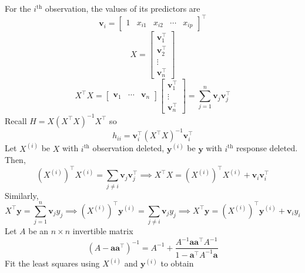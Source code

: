 For the $ i^{\text{th}} $ observation, the values
of its predictors are
\[ \symbf{v}_i=\begin{bmatrix}
            1 & x_{i1} & x_{i2} & \cdots & x_{i p}
      \end{bmatrix}^\top \]
\[ X=\begin{bmatrix}
            \symbf{v}_1^\top \\
            \symbf{v}_2^\top \\
            \vdots           \\
            \symbf{v}_n^\top
      \end{bmatrix} \]
\[ X^\top X=\begin{bmatrix}
            \symbf{v}_1 & \cdots & \symbf{v}_n
      \end{bmatrix}\begin{bmatrix}
            \symbf{v}_1^\top \\
            \vdots           \\
            \symbf{v}_n^\top
      \end{bmatrix}=\sum_{j=1}^{n}\symbf{v}_j\symbf{v}_j^\top \]
Recall $ H=X(X^\top X)^{-1}X^\top $ so
\[ h_{ii}=\symbf{v}_i^\top (X^\top X)^{-1}\symbf{v}_i^\top \]
Let $ X^{(i)} $ be $ X $ with $ i^{\text{th}} $ observation
deleted, $ \symbf{y}^{(i)} $ be $ \symbf{y} $ with $ i^{\text{th}} $
response deleted. Then,
\[ (X^{(i)})^{\top}X^{(i)}=\sum_{j\neq i}\symbf{v}_j\symbf{v}_j^\top
      \implies X^\top X=(X^{(i)})^\top X^{(i)}+\symbf{v}_i\symbf{v}_i^\top \]
Similarly,
\[ X^\top \symbf{y}=\sum_{j=1}^{n} \symbf{v}_j y_j\implies
      (X^{(i)})^\top \symbf{y}^{(i)}=\sum_{j\neq i}\symbf{v}_j y_j
      \implies X^{\top}\symbf{y}=(X^{(i)})^\top\symbf{y}^{(i)}+\symbf{v}_i y_i \]
Let $ A $ be an $ n\times n $ invertible matrix
\[ (A-\symbf{a}\symbf{a}^\top)^{-1}=A^{-1}+\frac{A^{-1}\symbf{a}\symbf{a}^\top
            A^{-1}}{1-\symbf{a}^\top A^{-1}\symbf{a}}  \]
Fit the least squares using $ X^{(i)} $ and $ \symbf{y}^{(i)} $
to obtain
